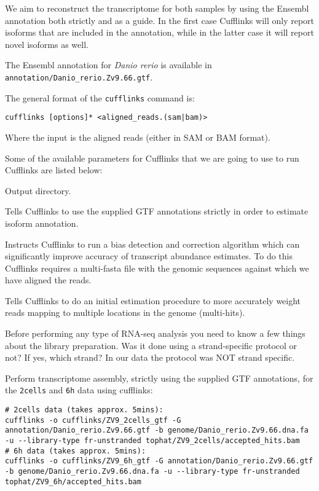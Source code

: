 We aim to reconstruct the transcriptome for both samples by using the Ensembl
annotation both strictly and as a guide. In the first case Cufflinks will only
report isoforms that are included in the annotation, while in the latter case
it will report novel isoforms as well.

The Ensembl annotation for \textit{Danio rerio} is available in
\texttt{annotation/Danio\_rerio.Zv9.66.gtf}.

\begin{information}
The general format of the \texttt{cufflinks} command is:
\begin{lstlisting}[style=command_syntax]
cufflinks [options]* <aligned_reads.(sam|bam)>
\end{lstlisting}
Where the input is the aligned reads (either in SAM or BAM format).
\end{information}

\begin{note}
Some of the available parameters for Cufflinks that we are going to use to run
Cufflinks are listed below:
\begin{description}[style=multiline,labelindent=0cm,align=right,leftmargin=\descriptionlabelspace,rightmargin=1.5cm,font=\ttfamily]
  \item[-o] Output directory.
  \item[-G] Tells Cufflinks to use the supplied GTF annotations strictly in order
  to estimate isoform annotation.
  \item[-b] Instructs Cufflinks to run a bias detection and correction algorithm
  which can significantly improve accuracy of transcript abundance estimates.
  To do this Cufflinks requires a multi-fasta file with the genomic sequences
  against which we have aligned the reads.
  \item[-u] Tells Cufflinks to do an initial estimation procedure to more
  accurately weight reads mapping to multiple locations in the genome
  (multi-hits).
  \item[--library-type] Before performing any type of RNA-seq analysis you need
  to know a few things about the library preparation. Was it done using a
  strand-specific protocol or not? If yes, which strand? In our data the protocol
  was NOT strand specific.
\end{description}
\end{note}

\begin{steps}
Perform transcriptome assembly, strictly using the supplied GTF annotations, for the \texttt{2cells} and \texttt{6h} data using cufflinks:
\begin{lstlisting}
# 2cells data (takes approx. 5mins):
cufflinks -o cufflinks/ZV9_2cells_gtf -G annotation/Danio_rerio.Zv9.66.gtf -b genome/Danio_rerio.Zv9.66.dna.fa -u --library-type fr-unstranded tophat/ZV9_2cells/accepted_hits.bam
# 6h data (takes approx. 5mins):
cufflinks -o cufflinks/ZV9_6h_gtf -G annotation/Danio_rerio.Zv9.66.gtf -b genome/Danio_rerio.Zv9.66.dna.fa -u --library-type fr-unstranded tophat/ZV9_6h/accepted_hits.bam
\end{lstlisting}
\end{steps}


